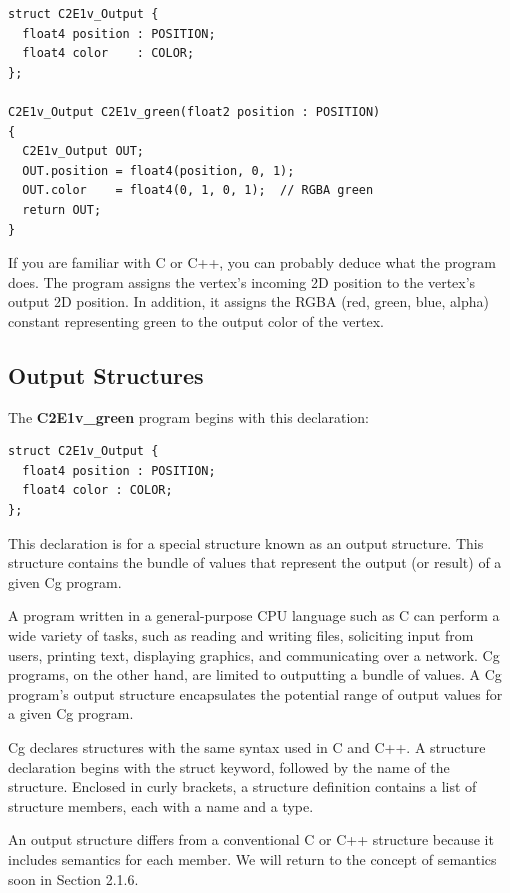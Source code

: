 \documentclass{book}
\begin{document}
\FloatBarrier
\begin{lstlisting}[caption=Example 2-1. The \textbf{C2E1v\_green} Vertex Program]
struct C2E1v_Output {
  float4 position : POSITION;
  float4 color    : COLOR;
};

C2E1v_Output C2E1v_green(float2 position : POSITION)
{
  C2E1v_Output OUT;
  OUT.position = float4(position, 0, 1);
  OUT.color    = float4(0, 1, 0, 1);  // RGBA green
  return OUT;
}
\end{lstlisting}
\FloatBarrier

If you are familiar with C or C++, you can probably deduce what the program does. The program assigns the vertex's incoming 2D position to the vertex's output 2D position. In addition, it assigns the RGBA (red, green, blue, alpha) constant representing green to the output color of the vertex.

\subsection{Output Structures}

The \textbf{C2E1v\_green} program begins with this declaration:

\FloatBarrier
\begin{lstlisting}
struct C2E1v_Output {
  float4 position : POSITION;
  float4 color : COLOR;
};
\end{lstlisting}
\FloatBarrier

This declaration is for a special structure known as an output structure. This structure contains the bundle of values that represent the output (or result) of a given Cg program.

A program written in a general-purpose CPU language such as C can perform a wide variety of tasks, such as reading and writing files, soliciting input from users, printing text, displaying graphics, and communicating over a network. Cg programs, on the other hand, are limited to outputting a bundle of values. A Cg program's output structure encapsulates the potential range of output values for a given Cg program.

Cg declares structures with the same syntax used in C and C++. A structure declaration begins with the struct keyword, followed by the name of the structure. Enclosed in curly brackets, a structure definition contains a list of structure members, each with a name and a type.

An output structure differs from a conventional C or C++ structure because it includes semantics for each member. We will return to the concept of semantics soon in Section 2.1.6.
\end{document}
